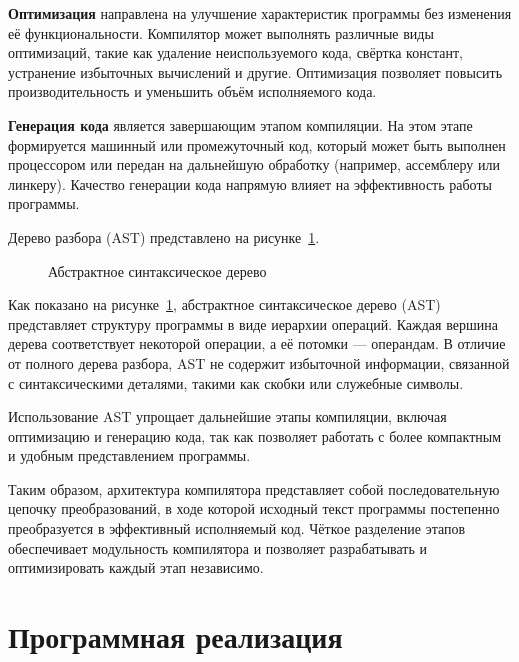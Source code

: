 \documentclass[coursework]{SCWorks}
\begin{document}
\textbf{Оптимизация} направлена на улучшение характеристик программы без изменения её функциональности. 
Компилятор может выполнять различные виды оптимизаций, такие как удаление неиспользуемого кода, 
свёртка констант, устранение избыточных вычислений и другие. 
Оптимизация позволяет повысить производительность и уменьшить объём исполняемого кода.

\textbf{Генерация кода} является завершающим этапом компиляции. 
На этом этапе формируется машинный или промежуточный код, который может быть выполнен процессором 
или передан на дальнейшую обработку (например, ассемблеру или линкеру). 
Качество генерации кода напрямую влияет на эффективность работы программы.

Дерево разбора (AST) представлено на рисунке~\ref{fig:ast}.

\begin{figure}[h]
\centering
{}
\caption{Абстрактное синтаксическое дерево}
\label{fig:ast}
\end{figure}

Как показано на рисунке~\ref{fig:ast}, абстрактное синтаксическое дерево (AST) 
представляет структуру программы в виде иерархии операций. 
Каждая вершина дерева соответствует некоторой операции, а её потомки — операндам. 
В отличие от полного дерева разбора, AST не содержит избыточной информации, 
связанной с синтаксическими деталями, такими как скобки или служебные символы.

Использование AST упрощает дальнейшие этапы компиляции, включая оптимизацию и генерацию кода, 
так как позволяет работать с более компактным и удобным представлением программы.

Таким образом, архитектура компилятора представляет собой последовательную цепочку преобразований, 
в ходе которой исходный текст программы постепенно преобразуется в эффективный исполняемый код. 
Чёткое разделение этапов обеспечивает модульность компилятора и позволяет разрабатывать 
и оптимизировать каждый этап независимо.

\section{Программная реализация}
\end{document}
